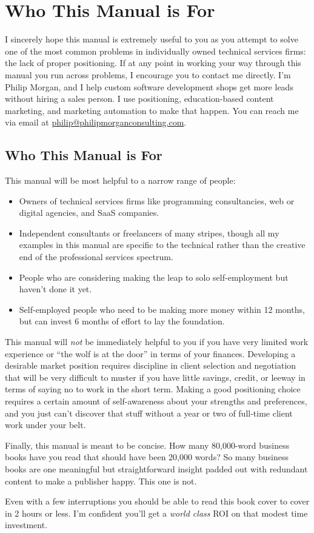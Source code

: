 \chapter{Who This Manual is For}

I sincerely hope this manual is extremely useful to you as you attempt to solve one of the most common problems in individually owned technical services firms: the lack of proper positioning.  If at any point in working your way through this manual you run across problems, I encourage you to contact me directly. I'm Philip Morgan, and I help custom software development shops get more leads without hiring a sales person. I use positioning, education-based content marketing, and marketing automation to make that happen. You can reach me via email at \href{mailto:philip@philipmorganconsulting.com}{philip@philipmorganconsulting.com}.

\section{Who This Manual is For}

This manual will be most helpful to a narrow range of people:

\begin{itemize}
\item Owners of technical services firms like programming consultancies, web or digital agencies, and SaaS companies.
\item Independent consultants or freelancers of many stripes, though all my examples in this manual are specific to the technical rather than the creative end of the professional services spectrum.
\item People who are considering making the leap to solo self-employment but haven't done it yet.
\item Self-employed people who need to be making more money within 12 months, but can invest 6 months of effort to lay the foundation.
\end{itemize}

This manual will \emph{not} be immediately helpful to you if you have very limited work experience or ``the wolf is at the door'' in terms of your finances. Developing a desirable market position requires discipline in client selection and negotiation that will be very difficult to muster if you have little savings, credit, or leeway in terms of saying no to work in the short term. Making a good positioning choice requires a certain amount of self-awareness about your strengths and preferences, and you just can't discover that stuff without a year or two of full-time client work under your belt.

Finally, this manual is meant to be concise. How many 80,000-word business books have you read that should have been 20,000 words? So many business books are one meaningful but straightforward insight padded out with redundant content to make a publisher happy. This one is not.

Even with a few interruptions you should be able to read this book cover to cover in 2 hours or less. I’m confident you’ll get a \emph{world class} ROI on that modest time investment.